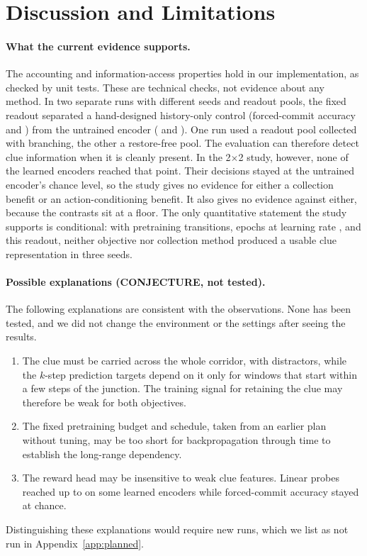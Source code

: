 \section{Discussion and Limitations}
\label{sec:discussion}

\paragraph{What the current evidence supports.}
The accounting and information-access properties hold in our implementation, as checked by unit tests. These are technical checks, not evidence about any method. In two separate runs with different seeds and readout pools, the fixed readout separated a hand-designed history-only control (forced-commit accuracy \DiagForcedInfoMin{} and \StudyForcedInfoMin{}) from the untrained encoder (\DiagForcedRandMax{} and \StudyForcedRandMax{}). One run used a readout pool collected with branching, the other a restore-free pool. The evaluation can therefore detect clue information when it is cleanly present. In the 2$\times$2 study, however, none of the learned encoders reached that point. Their decisions stayed at the untrained encoder's chance level, so the study gives no evidence for either a collection benefit or an action-conditioning benefit. It also gives no evidence against either, because the contrasts sit at a floor. The only quantitative statement the study supports is conditional: with \StudyCfgPretrainBudget{} pretraining transitions, \StudyCfgPretrainEpochs{} epochs at learning rate \StudyCfgPretrainLR{}, and this readout, neither objective nor collection method produced a usable clue representation in three seeds.

\paragraph{Possible explanations (CONJECTURE, not tested).}
The following explanations are consistent with the observations. None has been tested, and we did not change the environment or the settings after seeing the results.
\begin{enumerate}
  \item The clue must be carried across the whole corridor, with distractors, while the $k$-step prediction targets depend on it only for windows that start within a few steps of the junction. The training signal for retaining the clue may therefore be weak for both objectives.
  \item The fixed pretraining budget and schedule, taken from an earlier plan without tuning, may be too short for backpropagation through time to establish the long-range dependency.
  \item The reward head may be insensitive to weak clue features. Linear probes reached up to \StudyProbeLearnedMax{} on some learned encoders while forced-commit accuracy stayed at chance.
\end{enumerate}
Distinguishing these explanations would require new runs, which we list as not run in Appendix~\ref{app:planned}.

